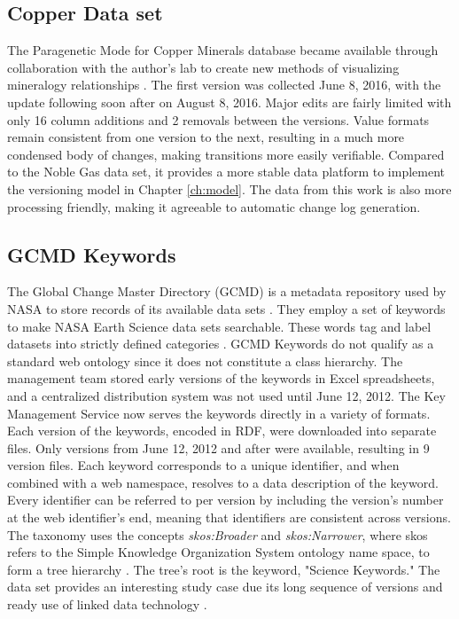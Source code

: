 \subsection{Copper Data set}

The Paragenetic Mode for Copper Minerals database became available through collaboration with the author's lab to create new methods of visualizing mineralogy relationships \cite{Morrison2016}.
The first version was collected June 8, 2016, with the update following soon after on August 8, 2016.
Major edits are fairly limited with only 16 column additions and 2 removals between the versions.
Value formats remain consistent from one version to the next, resulting in a much more condensed body of changes, making transitions more easily verifiable.
Compared to the Noble Gas data set, it provides a more stable data platform to implement the versioning model in Chapter \ref{ch:model}.
The data from this work is also more processing friendly, making it agreeable to automatic change log generation.

\subsection{GCMD Keywords}

The Global Change Master Directory (GCMD) is a metadata repository used by NASA to store records of its available data sets \cite{Miled:2001:GCM:372202.372324}.
They employ a set of keywords to make NASA Earth Science data sets searchable.
These words tag and label datasets into strictly defined categories \cite{GCMDKey}.
GCMD Keywords do not qualify as a standard web ontology since it does not constitute a class hierarchy.
The management team stored early versions of the keywords in Excel spreadsheets, and a centralized distribution system was not used until June 12, 2012.
The Key Management Service now serves the keywords directly in a variety of formats.
Each version of the keywords, encoded in RDF, were downloaded into separate files.
Only versions from June 12, 2012 and after were available, resulting in 9 version files.
Each keyword corresponds to a unique identifier, and when combined with a web namespace, resolves to a data description of the keyword.
Every identifier can be referred to per version by including the version's number at the web identifier's end, meaning that identifiers are consistent across versions.
The taxonomy uses the concepts \textit{skos:Broader} and \textit{skos:Narrower}, where skos refers to the Simple Knowledge Organization System ontology name space, to form a tree hierarchy \cite{skos}.
The tree's root is the keyword, "Science Keywords."
The data set provides an interesting study case due its long sequence of versions and ready use of linked data technology \cite{Stevens2016}.

